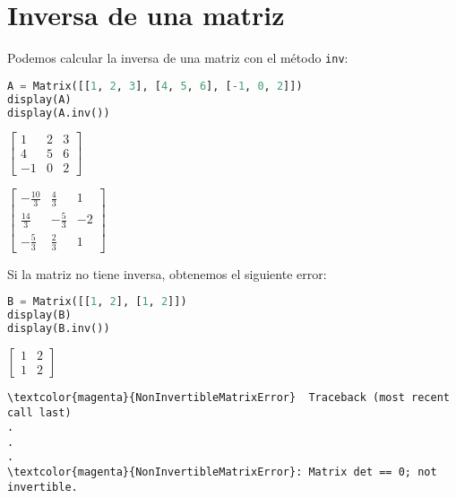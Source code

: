 \documentclass[a4,11pt]{aleph-notas}
\begin{document}
\encabezado

\vspace*{-10mm}
\section{Inversa de una matriz}

Podemos calcular la inversa de una matriz con el método \texttt{inv}:

\begin{pycodigo}
    \begin{ipynbcodigo}\begin{lstlisting}[language=Python]
A = Matrix([[1, 2, 3], [4, 5, 6], [-1, 0, 2]])
display(A)
display(A.inv())
    \end{lstlisting}\end{ipynbcodigo}
    \begin{ipynbsalida}[2mm]
$\displaystyle \left[\begin{matrix}1 & 2 & 3\\4 & 5 & 6\\-1 & 0 & 2\end{matrix}\right]$

$\displaystyle \left[\begin{matrix}- \frac{10}{3} & \frac{4}{3} & 1\\\frac{14}{3} & - \frac{5}{3} & -2\\- \frac{5}{3} & \frac{2}{3} & 1\end{matrix}\right]$
    \end{ipynbsalida}
\end{pycodigo}
    
Si la matriz no tiene inversa, obtenemos el siguiente error:
\begin{pycodigo}
    \begin{ipynbcodigo}\begin{lstlisting}[language=Python]
B = Matrix([[1, 2], [1, 2]])
display(B)
display(B.inv())
    \end{lstlisting}\end{ipynbcodigo}
    \begin{ipynbsalida}[2mm]
$\displaystyle \left[\begin{matrix}1 & 2\\1 & 2\end{matrix}\right]$

\begin{Verbatim}[commandchars=\\\{\}]
\textcolor{magenta}{NonInvertibleMatrixError}  Traceback (most recent call last)
.
.
.
\textcolor{magenta}{NonInvertibleMatrixError}: Matrix det == 0; not invertible.
    \end{Verbatim}
    \end{ipynbsalida}
\end{pycodigo}
\end{document}
